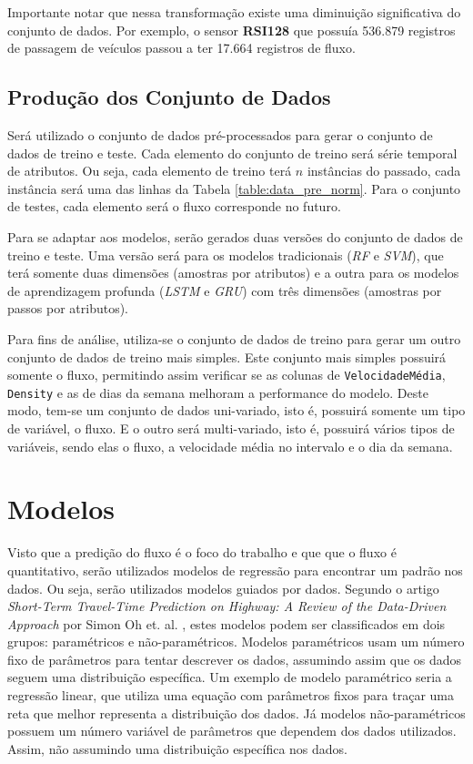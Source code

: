 Importante notar que nessa transformação existe uma diminuição significativa do conjunto de dados. Por exemplo, o sensor \textbf{RSI128} que possuía 536.879 registros de passagem de veículos passou a ter 17.664 registros de fluxo.


\subsection{Produção dos Conjunto de Dados}

Será utilizado o conjunto de dados pré-processados para gerar o conjunto de dados de treino e teste. Cada elemento do conjunto de treino será série temporal de atributos. Ou seja, cada elemento de treino terá \(n\) instâncias do passado, cada instância será uma das linhas da Tabela \ref{table:data_pre_norm}. Para o conjunto de testes, cada elemento será o fluxo corresponde no futuro.


Para se adaptar aos modelos, serão gerados duas versões do conjunto de dados de treino e teste. Uma versão será para os modelos tradicionais (\textit{\acrshort{RF}} e \textit{\acrshort{SVM}}), que terá somente duas dimensões (amostras por atributos) e a outra para os modelos de aprendizagem profunda (\textit{\acrshort{LSTM}} e \textit{\acrshort{GRU}}) com três dimensões (amostras por passos por atributos).

Para fins de análise, utiliza-se o conjunto de dados de treino para gerar um outro conjunto de dados de treino mais simples. Este conjunto mais simples possuirá somente o fluxo, permitindo assim verificar se as colunas de \texttt{VelocidadeMédia}, \texttt{Density} e as de dias da semana melhoram a performance do modelo. Deste modo, tem-se um conjunto de dados uni-variado, isto é, possuirá somente um tipo de variável, o fluxo. E o outro será multi-variado, isto é, possuirá vários tipos de variáveis, sendo elas o fluxo, a velocidade média no intervalo e o dia da semana.

\section{Modelos}

Visto que a predição do fluxo é o foco do trabalho e que que o fluxo é quantitativo, serão utilizados modelos de regressão para encontrar um padrão nos dados. Ou seja, serão utilizados modelos guiados por dados. Segundo o artigo \textit{Short-Term Travel-Time Prediction on Highway: A Review of the Data-Driven Approach} por Simon Oh et. al. \cite{doi:10.1080/01441647.2014.992496}, estes modelos podem ser classificados em dois grupos: paramétricos e não-paramétricos. Modelos paramétricos usam um número fixo de parâmetros para tentar descrever os dados, assumindo assim que os dados seguem uma distribuição específica. Um exemplo de modelo paramétrico seria a regressão linear, que utiliza uma equação com parâmetros fixos para traçar uma reta que melhor representa a distribuição dos dados. Já modelos não-paramétricos possuem um número variável de parâmetros que dependem dos dados utilizados. Assim, não assumindo uma distribuição específica nos dados.

